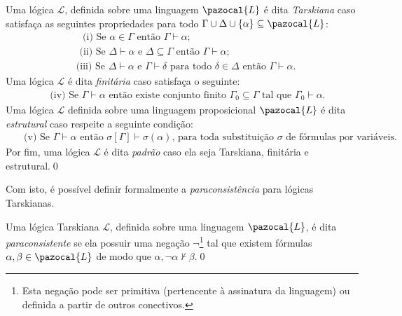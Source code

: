 \begin{definicao}
    \label{def:padrao}
    Uma lógica $\mathcal{L}$, definida sobre uma linguagem $\pazocal{L}$ é dita \textit{Tarskiana} caso satisfaça as seguintes propriedades para todo $\Gamma \cup \Delta \cup \{\alpha\} \subseteq \pazocal{L}$:
    \begin{align*}
         & \text{~~(i) Se } \alpha \in \Gamma \text{ então } \Gamma \vdash \alpha;                                                                       \\
         & \text{~(ii) Se } \Delta \vdash \alpha \text{ e } \Delta \subseteq \Gamma \text{ então } \Gamma \vdash \alpha;                                 \\
         & \text{(iii) Se } \Delta \vdash \alpha \text{ e } \Gamma \vdash \delta \text{ para todo } \delta \in \Delta \text{ então } \Gamma \vdash \alpha.
    \end{align*}
    Uma lógica $\mathcal{L}$ é dita \textit{finitária} caso satisfaça o seguinte:
    \begin{align*}
         & \text{~(iv) Se } \Gamma \vdash \alpha \text{ então existe conjunto finito } \Gamma_{0} \subseteq \Gamma \text{ tal que } \Gamma_{0} \vdash \alpha.
    \end{align*}
    Uma lógica $\mathcal{L}$ definida sobre uma linguagem proposicional $\pazocal{L}$ é dita \textit{estrutural} caso respeite a seguinte condição:
    \begin{align*}
         & \text{~~(v) Se } \Gamma \vdash \alpha \text{ então } \sigma [\Gamma] \vdash \sigma(\alpha) \text{, para toda substituição } \sigma \text{ de fórmulas por variáveis.}
    \end{align*}
    Por fim, uma lógica $\mathcal{L}$ é dita \textit{padrão} caso ela seja Tarskiana, finitária e estrutural.\qed{}
\end{definicao}
Com isto, é possível definir formalmente a \textit{paraconsistência} para lógicas Tarskianas.

\begin{definicao}
    \label{def:tarskiana_paracons}
    Uma lógica Tarskiana $\mathcal{L}$, definida sobre uma linguagem $\pazocal{L}$, é dita \textit{paraconsistente} se ela possuir uma negação $\neg$\footnote{Esta negação pode ser primitiva (pertencente à assinatura da linguagem) ou definida a partir de outros conectivos.} tal que existem fórmulas $\alpha, \beta \in \pazocal{L}$ de modo que $\alpha, \neg \alpha \nvdash \beta$.\qed{}
\end{definicao}

